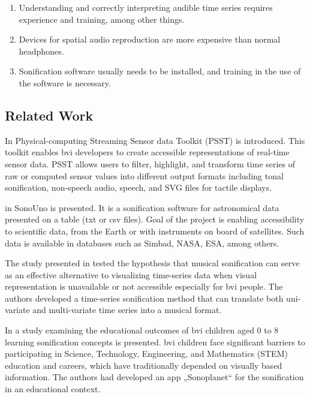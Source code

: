 \renewcommand{\labelenumi}{$-$}
\begin{enumerate}
\item Understanding and correctly interpreting audible time series requires experience and training, among other things.

\item Devices for spatial audio reproduction are more expensive than normal headphones.

\item Sonification software usually needs to be installed, and training in the use of the software is necessary. 
\end{enumerate}
 
 
\subsection*{Related Work}

In \cite{potluri2022psst} Physical-computing Streaming Sensor data Toolkit (PSST) is introduced. This  toolkit enables \ac{bvi}  developers to create accessible representations of real-time sensor data. PSST allows users to filter, highlight, and transform time series of raw or computed sensor values into different output formats including tonal sonification, non-speech audio, speech, and SVG files for tactile displays. 

in \cite{Casado2021} SonoUno is presented. It is a sonification software for astronomical data presented on a table (txt or csv files). Goal of the project is enabling accessibility to scientific data, from the Earth or with instruments on board of satellites. Such data is available in databases
such as Simbad, NASA, ESA, among others.

The study presented in \cite{Last2015} tested the hypothesis that musical sonification can serve as an effective alternative to visualizing time-series data when visual representation is unavailable or not accessible especially for \ac{bvi} people. The authors developed a time-series sonification method that can translate both uni-variate and multi-variate time series into a musical format.

In \cite{damsa2024}  a study examining the educational outcomes of \ac{bvi} children aged 0 to 8  learning  sonification concepts is presented. 
\ac{bvi} children  face significant barriers to participating in Science, Technology, Engineering, and Mathematics (STEM) education and careers, which have traditionally depended on visually based information. The authors had developed  an app „Sonoplanet“ for the sonification in an  educational context.
